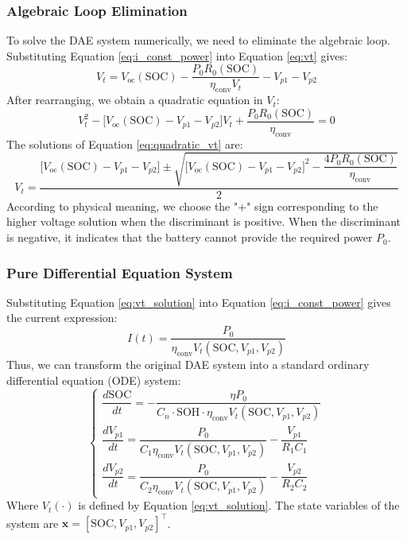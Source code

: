 \subsubsection{Algebraic Loop Elimination}
To solve the DAE system numerically, we need to eliminate the algebraic loop. 
Substituting Equation \eqref{eq:i_const_power} into Equation \eqref{eq:vt} gives:
\begin{equation}
V_t = V_{\text{oc}}(\text{SOC}) - \frac{P_0 R_0(\text{SOC})}{\eta_{\text{conv}} V_t} - V_{p1} - V_{p2}
\end{equation}
After rearranging, we obtain a quadratic equation in $V_t$:
\begin{equation}
V_t^2 - \big[V_{\text{oc}}(\text{SOC}) - V_{p1} - V_{p2}\big] V_t + \frac{P_0 R_0(\text{SOC})}{\eta_{\text{conv}}} = 0
\label{eq:quadratic_vt}
\end{equation}
The solutions of Equation \eqref{eq:quadratic_vt} are:
\begin{equation}
V_t = \frac{\big[V_{\text{oc}}(\text{SOC}) - V_{p1} - V_{p2}\big] \pm \sqrt{\big[V_{\text{oc}}(\text{SOC}) - V_{p1} - V_{p2}\big]^2 - \dfrac{4P_0 R_0(\text{SOC})}{\eta_{\text{conv}}}}}{2}
\label{eq:vt_solution}
\end{equation}
According to physical meaning, we choose the "+" sign corresponding to the higher voltage solution when the discriminant is positive. 
When the discriminant is negative, it indicates that the battery cannot provide the required power $P_0$.

\subsubsection{Pure Differential Equation System}
Substituting Equation \eqref{eq:vt_solution} into Equation \eqref{eq:i_const_power} gives the current expression:
\begin{equation}
I(t) = \frac{P_0}{\eta_{\text{conv}} V_t(\text{SOC}, V_{p1}, V_{p2})}
\end{equation}
Thus, we can transform the original DAE system into a standard ordinary differential equation (ODE) system:
\begin{equation}
\begin{cases}
\dfrac{d\text{SOC}}{dt} = -\dfrac{\eta P_0}{C_n \cdot \text{SOH} \cdot \eta_{\text{conv}} V_t(\text{SOC}, V_{p1}, V_{p2})} \\[10pt]
\dfrac{dV_{p1}}{dt} = \dfrac{P_0}{C_1 \eta_{\text{conv}} V_t(\text{SOC}, V_{p1}, V_{p2})} - \dfrac{V_{p1}}{R_1 C_1} \\[10pt]
\dfrac{dV_{p2}}{dt} = \dfrac{P_0}{C_2 \eta_{\text{conv}} V_t(\text{SOC}, V_{p1}, V_{p2})} - \dfrac{V_{p2}}{R_2 C_2}
\end{cases}
\label{eq:ode_system}
\end{equation}
Where $V_t(\cdot)$ is defined by Equation \eqref{eq:vt_solution}. 
The state variables of the system are $\mathbf{x} = [\text{SOC}, V_{p1}, V_{p2}]^\top$.

